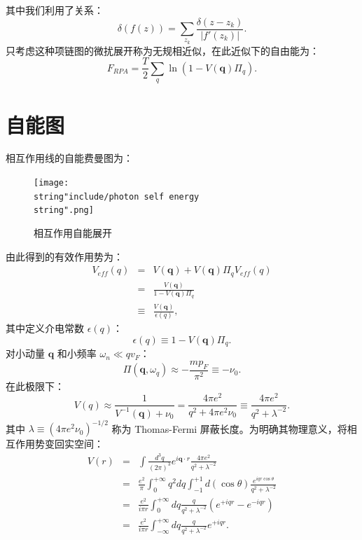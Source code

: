 \documentclass[10pt,UTF8]{ctexart}
\begin{document}
其中我们利用了关系：
\begin{equation}
	\delta\left(f\left(z\right)\right)=\sum_{z_{k}}\frac{\delta\left(z-z_{k}\right)}{\left|f'\left(z_{k}\right)\right|}.
\end{equation}
只考虑这种项链图的微扰展开称为无规相近似，在此近似下的自由能为：
\begin{equation}
	F_{RPA} = \frac{T}{2} \sum_{q} \ln(1-V(\bm q)\Pi_q).
\end{equation}


\section*{自能图}
\noindent
相互作用线的自能费曼图为：
\begin{figure}[H]
\begin{centering}
\texttt{[image: \\string"include/photon self energy\\string".png]}
\par\end{centering}
\centering{}\caption{相互作用自能展开}
\end{figure}
\noindent
由此得到的有效作用势为：
\begin{eqnarray}
	V_{eff}\left(q\right) & = & V\left(\bm{q}\right)+V\left(\bm{q}\right)\Pi_{q}V_{eff}\left(q\right)\\
 	& = & \frac{V\left(\bm{q}\right)}{1-V\left(\bm{q}\right)\Pi_{q}}\\
 	& \equiv & \frac{V\left(\bm{q}\right)}{\epsilon\left(q\right)},
\end{eqnarray}
其中定义介电常数 $\epsilon(q)$：
\begin{equation}
	\epsilon\left(q\right)\equiv1-V\left(\bm{q}\right)\Pi_{q}.
\end{equation}
对小动量 $\bm q$ 和小频率 $\omega_n \ll q v_F$：
\begin{equation}
	\Pi\left(\bm{q},\omega_{q}\right)\approx-\frac{mp_{F}}{\pi^{2}}\equiv-\nu_{0}.
\end{equation}
在此极限下：
\begin{equation}
	V\left(q\right)
	\approx\frac{1}{V^{-1}\left(\bm{q}\right)+\nu_{0}}
	=\frac{4\pi e^{2}}{q^{2}+4\pi e^{2}\nu_{0}}
	\equiv \frac{4\pi e^{2}}{q^{2}+\lambda^{-2}}.
\end{equation}
其中 $\lambda\equiv\left(4\pi e^{2}\nu_{0}\right)^{-1/2}$ 称为
Thomas-Fermi 屏蔽长度。为明确其物理意义，将相互作用势变回实空间：
\begin{eqnarray}
	V\left(r\right) & = & \int\frac{d^{3}q}{\left(2\pi\right)^{3}}e^{i\bm{q}\cdot r}\frac{4\pi e^{2}}{q^{2}+\lambda^{-2}}\\
 	& = & \frac{e^{2}}{\pi}\int_{0}^{+\infty}q^{2}dq\int_{-1}^{+1}d\left(\cos\theta\right)\frac{e^{iqr\cos\theta}}{q^{2}+\lambda^{-2}}\\
 	& = & \frac{e^{2}}{i\pi r}\int_{0}^{+\infty}dq\frac{q}{q^{2}+\lambda^{-2}}\left(e^{+iqr}-e^{-iqr}\right)\\
 	& = & \frac{e^{2}}{i\pi r}\int_{-\infty}^{+\infty}dq\frac{q}{q^{2}+\lambda^{-2}}e^{+iqr}.
\end{eqnarray}
\end{document}
